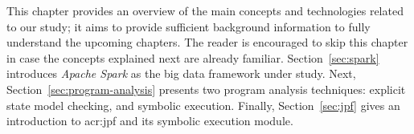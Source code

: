 \label{ch:relatedwork}

This chapter provides an overview of the main concepts and technologies related to our study; it aims to provide sufficient background information to fully understand the upcoming chapters. The reader is encouraged to skip this chapter in case the concepts explained next are already familiar. Section~\ref{sec:spark} introduces \textit{Apache Spark} as the big data framework under study. Next, Section~\ref{sec:program-analysis} presents two program analysis techniques: explicit state model checking, and symbolic execution. Finally, Section~\ref{sec:jpf} gives an introduction to \acrfull{acr:jpf} and its symbolic execution module.



